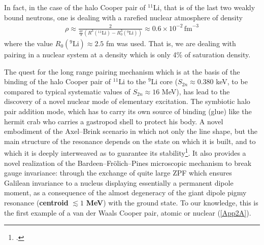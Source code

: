 \begin{subappendices}
In fact, in the case of the halo Cooper pair of $^{11}$Li, that is of the last two weakly bound neutrons, one is dealing with a rarefied nuclear atmosphere of density
\begin{align}\label{eq5App3E}
\rho\approx\frac{2}{\frac{4\pi}{3}(R^3(^{11}\text{Li})-R_0^3(^{9}\text{Li}))}\approx 0.6\times 10^{-2}\,\text{fm}^{-3}
\end{align}
where the value $R_0(^9\text{Li})\approx 2.5$ fm was used. That is, we are dealing with pairing in a nuclear system at a density which is only 4\% of saturation density.

The quest for the long range pairing mechanism which is at the basis of the binding of the halo Cooper pair of $^{11}$Li to the $^9$Li core ($S_{2n}\approx0.380$ keV, to be compared to typical systematic values of $S_{2n}\approx 16$ MeV), has lead to the discovery of a novel nuclear mode of elementary excitation. The symbiotic halo pair addition mode, which has to carry its own source of binding (glue) like the hermit crab who carries a gastropod shell to protect his body. A novel embodiment of the Axel--Brink scenario in which not only the line shape, but the main structure of the resonance depends on the state on which it is built, and to which it is deeply interweaved as to guarantee its stability\footnote{\cite{Axel:62,Brink:55}.}. It also provides a novel realization of the Bardeen--Fr\"olich--Pines microscopic mechanism to break gauge invariance: through the exchange of quite large ZPF which ensures Galilean invariance to a nucleus displaying essentially a permanent dipole moment, as a consequence of the almost degeneracy of the giant dipole pigmy resonance (\textbf{centroid} $\lesssim 1$ \textbf{MeV}) with the ground state. To our knowledge, this is the first example of a van der Waals Cooper pair, atomic or nuclear (\ref{App2A}).



\end{subappendices}
